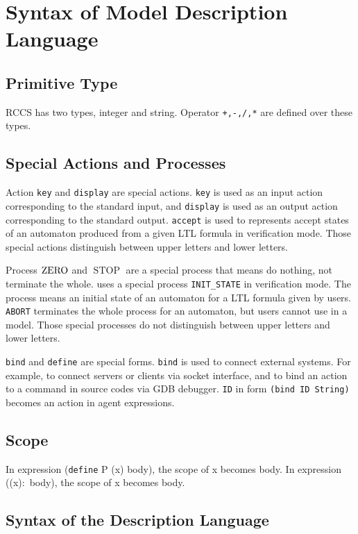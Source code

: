 \documentclass[12pt,a4paper,titlepage]{article}
\theoremstyle{break}
\begin{document}
\section{Syntax of Model Description Language}
\subsection{Primitive Type}
RCCS has two types, integer and string.
Operator {\tt +,-,/,*} are defined over these types.
\subsection{Special Actions and Processes}
Action {\tt key} and {\tt display} are special actions. 
{\tt key} is used as an input action corresponding to the standard input, and {\tt display} is used as an output action corresponding to the standard output.
{\tt accept} is used to represents accept states of an automaton produced from a given LTL formula in verification mode.
Those special actions distinguish between upper letters and lower letters.

Process \(\mathop{\mathrm{ZERO}}\nolimits\) and \({\mathop{\mathrm{STOP}}\nolimits}\) are a special process that means do nothing, not terminate the whole.
\NHK uses a special process {\tt INIT\_STATE} in verification mode.
The process means an initial state of an automaton for a LTL formula given by users.
{\tt ABORT} terminates the whole process for an automaton, but users cannot use in a model.
Those special processes do not distinguish between upper letters and lower letters.

{\tt bind} and {\tt define} are special forms.
{\tt bind} is used to connect external systems.
For example, to connect servers or clients via socket interface,
 and to bind an action to a command in source codes via GDB debugger.
{\tt ID} in form {\tt (bind ID String)} becomes an action in agent expressions.
\subsection{Scope}
In expression ({\tt define} P (x) body), the scope of x becomes body.
In expression ((x)\(\colon\) body), the scope of x becomes body.
\subsection{Syntax of the Description Language}\label{sec:RCCSsyntax}

\end{document}
